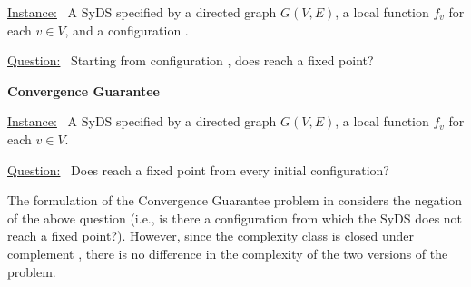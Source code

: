 \smallskip
\noindent
\underline{\textsf{Instance:}}~ A SyDS \cals{} specified 
by a directed graph $G(V,E)$, a local function $f_v$ 
for each $v \in V$, and a configuration \calc{}. 

\noindent
\underline{\textsf{Question:}}~ Starting from configuration \calc,
does  \cals{} reach a fixed point? 




\smallskip
\noindent
\textbf{Convergence Guarantee} %

\smallskip
\noindent
\underline{\textsf{Instance:}}~ A SyDS \cals{} specified 
by a directed
graph $G(V,E)$, a local function $f_v$ for each $v \in V$. 

\noindent
\underline{\textsf{Question:}}~ Does \cals{} reach a fixed point from
every initial configuration?

The formulation of the Convergence Guarantee problem 
in \cite{Chistikov-etal-2020} considers the negation of the above
question (i.e., is there a configuration \calc{} from which
the SyDS does not reach a fixed point?).
However, since the complexity class \cpsp{} is closed under
complement \cite{Papadimitriou-1993}, there is no difference in
the complexity of the two versions of the problem.
